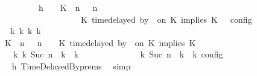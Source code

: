 \begin{isabellebody}
\ \ \ \ \ \ \isamarkupfalse%
\ {\isacharminus}\isanewline
\ \ \ \ \ \ \ \ \isamarkupfalse%
\ h{}{\isacharcolon}\ {\isacartoucheopen}{\isasymrho}\ {\isasymin}\ {\isasymlbrakk}\ {\isacharparenleft}{\isacharparenleft}K\ {\isasymnot}{\isasymUp}\ n{\isacharparenright}\ {\isacharhash}\ {\isasymGamma}{\isacharparenright}{\isacharcomma}\ n\isanewline
\ \ \ \ \ \ \ \ \ \ \ \ \ \ \ \ \ \ \ \ \ \ \ \ \ {\isasymturnstile}\ {\isasymPsi}\ {\isasymtriangleright}\ {\isacharparenleft}{\isacharparenleft}K\ time{\isacharminus}delayed\ by\ {\isasymdelta}{\isasymtau}\ on\ K\ implies\ K\ {\isacharhash}\ {\isasymPhi}{\isacharparenright}\ {\isasymrbrakk}\isactrlsub c\isactrlsub o\isactrlsub n\isactrlsub f\isactrlsub i\isactrlsub g{\isacartoucheclose}\isanewline
\ \ \ \ \ \ \ \ \isamarkupfalse%
\ \isamarkupfalse%
\ {\isacartoucheopen}{\isasymexists}{\isasymGamma}\isactrlsub k\ {\isasymPsi}\isactrlsub k\ {\isasymPhi}\isactrlsub k\ k{\isachardot}\isanewline
\ \ \ \ \ \ \ \ \ \ {\isacharparenleft}{\isacharparenleft}{\isacharparenleft}{\isacharparenleft}K\ {\isasymnot}{\isasymUp}\ n{\isacharparenright}\ {\isacharhash}\ {\isasymGamma}{\isacharparenright}{\isacharcomma}\ n\ {\isasymturnstile}\ {\isasymPsi}\ {\isasymtriangleright}\ {\isacharparenleft}{\isacharparenleft}K\ time{\isacharminus}delayed\ by\ {\isasymdelta}{\isasymtau}\ on\ K\ implies\ K\ {\isacharhash}\ {\isasymPhi}{\isacharparenright}{\isacharparenright}\isanewline
\ \ \ \ \ \ \ \ \ \ \ \ {\isasymhookrightarrow}\isactrlbsup k\isactrlesup \ {\isacharparenleft}{\isasymGamma}\isactrlsub k{\isacharcomma}\ Suc\ n\ {\isasymturnstile}\ {\isasymPsi}\isactrlsub k\ {\isasymtriangleright}\ {\isasymPhi}\isactrlsub k{\isacharparenright}{\isacharparenright}\isanewline
\ \ \ \ \ \ \ \ \ \ {\isasymand}\ {\isasymrho}\ {\isasymin}\ {\isasymlbrakk}\ {\isasymGamma}\isactrlsub k{\isacharcomma}\ Suc\ n\ {\isasymturnstile}\ {\isasymPsi}\isactrlsub k\ {\isasymtriangleright}\ {\isasymPhi}\isactrlsub k\ {\isasymrbrakk}\isactrlsub c\isactrlsub o\isactrlsub n\isactrlsub f\isactrlsub i\isactrlsub g{\isacartoucheclose}\isanewline
\ \ \ \ \ \ \ \ \ \ \isamarkupfalse%
\ h{}\ TimeDelayedBy{\isachardot}prems\ \isamarkupfalse%
\ simp\isanewline
\ \ \ \ \ \ \ \ \isamarkupfalse%

\end{isabellebody}
